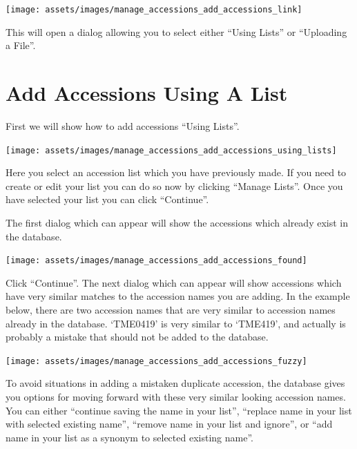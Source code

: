 \documentclass[
  12pt,
]{book}
\begin{document}
\begin{center}\texttt{[image: assets/images/manage\_accessions\_add\_accessions\_link]} \end{center}

This will open a dialog allowing you to select either ``Using Lists'' or ``Uploading a File''.

\hypertarget{add-accessions-using-a-list}{%
\section{Add Accessions Using A List}\label{add-accessions-using-a-list}}

First we will show how to add accessions ``Using Lists''.

\begin{center}\texttt{[image: assets/images/manage\_accessions\_add\_accessions\_using\_lists]} \end{center}

Here you select an accession list which you have previously made. If you need to create or edit your list you can do so now by clicking ``Manage Lists''. Once you have selected your list you can click ``Continue''.

The first dialog which can appear will show the accessions which already exist in the database.

\begin{center}\texttt{[image: assets/images/manage\_accessions\_add\_accessions\_found]} \end{center}

Click ``Continue''. The next dialog which can appear will show accessions which have very similar matches to the accession names you are adding. In the example below, there are two accession names that are very similar to accession names already in the database. `TME0419' is very similar to `TME419', and actually is probably a mistake that should not be added to the database.

\begin{center}\texttt{[image: assets/images/manage\_accessions\_add\_accessions\_fuzzy]} \end{center}

To avoid situations in adding a mistaken duplicate accession, the database gives you options for moving forward with these very similar looking accession names. You can either ``continue saving the name in your list'', ``replace name in your list with selected existing name'', ``remove name in your list and ignore'', or ``add name in your list as a synonym to selected existing name''.
\end{document}
